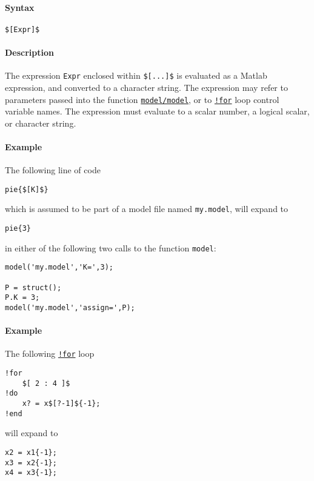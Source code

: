 


	\paragraph{Syntax}\label{syntax}

\begin{verbatim}
$[Expr]$
\end{verbatim}

\paragraph{Description}\label{description}

The expression \texttt{Expr} enclosed within \texttt{\${[}...{]}\$} is
evaluated as a Matlab expression, and converted to a character string.
The expression may refer to parameters passed into the function
\href{model}{\texttt{model/model}}, or to
\href{modellang/for}{\texttt{!for}} loop control variable names. The
expression must evaluate to a scalar number, a logical scalar, or
character string.

\paragraph{Example}\label{example}

The following line of code

\begin{verbatim}
pie{$[K]$}
\end{verbatim}

which is assumed to be part of a model file named \texttt{my.model},
will expand to

\begin{verbatim}
pie{3}
\end{verbatim}

in either of the following two calls to the function \texttt{model}:

\begin{verbatim}
model('my.model','K=',3);

P = struct();
P.K = 3;
model('my.model','assign=',P);
\end{verbatim}

\paragraph{Example}\label{example-1}

The following \href{modellang/for}{\texttt{!for}} loop

\begin{verbatim}
!for
    $[ 2 : 4 ]$
!do
    x? = x$[?-1]${-1};
!end
\end{verbatim}

will expand to

\begin{verbatim}
x2 = x1{-1};
x3 = x2{-1};
x4 = x3{-1};
\end{verbatim}


